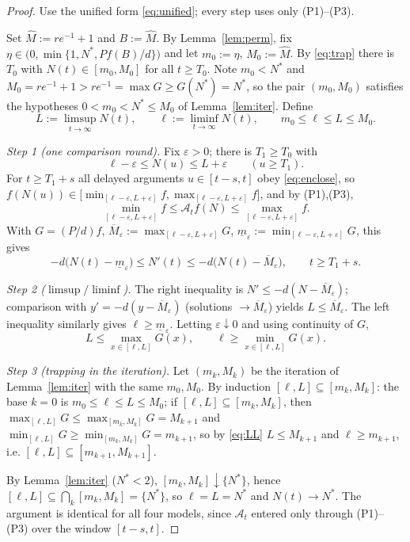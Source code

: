 \documentclass[12pt]{article}
\theoremstyle{definition}
\begin{document}
\begin{proof}
Use the unified form \eqref{eq:unified}; every step uses only (P1)--(P3).

Set $\widehat M:=re^{-1}+1$ and $B:=\widehat M$. By Lemma~\ref{lem:perm},
fix $\eta\in\bigl(0,\min\{1,N^*,Pf(B)/d\}\bigr)$ and let $m_0:=\eta$,
$M_0:=\widehat M$. By \eqref{eq:trap} there is $T_0$ with
$N(t)\in[m_0,M_0]$ for all $t\ge T_0$. Note $m_0<N^*$ and $M_0=re^{-1}+1>re^{-1}
=\max G\ge G(N^*)=N^*$, so the pair $(m_0,M_0)$ satisfies the hypotheses
$0<m_0<N^*\le M_0$ of Lemma~\ref{lem:iter}. Define
\[
  L:=\limsup_{t\to\infty}N(t),\qquad \ell:=\liminf_{t\to\infty}N(t),
  \qquad m_0\le\ell\le L\le M_0 .
\]

\emph{Step 1 (one comparison round).} Fix $\varepsilon>0$; there is $T_1\ge T_0$
with
\begin{equation}\label{eq:enclose}
  \ell-\varepsilon\le N(u)\le L+\varepsilon\qquad(u\ge T_1).
\end{equation}
For $t\ge T_1+s$ all delayed arguments $u\in[t-s,t]$ obey \eqref{eq:enclose}, so
$f(N(u))\in\bigl[\min_{[\ell-\varepsilon,L+\varepsilon]}f,
\max_{[\ell-\varepsilon,L+\varepsilon]}f\bigr]$, and by (P1),(P3),
\[
  \min_{[\ell-\varepsilon,L+\varepsilon]}f\le\mathcal A_tf(N)
  \le\max_{[\ell-\varepsilon,L+\varepsilon]}f .
\]
With $G=(P/d)f$, $\overline M_\varepsilon:=\max_{[\ell-\varepsilon,L+\varepsilon]}G$,
$\underline m_\varepsilon:=\min_{[\ell-\varepsilon,L+\varepsilon]}G$, this gives
\begin{equation}\label{eq:diffineq}
  -d\bigl(N(t)-\underline m_\varepsilon\bigr)\le N'(t)\le
  -d\bigl(N(t)-\overline M_\varepsilon\bigr),\qquad t\ge T_1+s .
\end{equation}

\emph{Step 2 ($\limsup/\liminf$).} The right inequality is
$N'\le -d(N-\overline M_\varepsilon)$; comparison with
$y'=-d(y-\overline M_\varepsilon)$ (solutions $\to\overline M_\varepsilon$)
yields $L\le\overline M_\varepsilon$. The left inequality similarly gives
$\ell\ge\underline m_\varepsilon$. Letting $\varepsilon\downarrow0$ and using
continuity of $G$,
\begin{equation}\label{eq:LL}
  L\le \max_{x\in[\ell,L]}G(x),\qquad \ell\ge\min_{x\in[\ell,L]}G(x).
\end{equation}

\emph{Step 3 (trapping in the iteration).} Let $(m_k,M_k)$ be the iteration of
Lemma~\ref{lem:iter} with the same $m_0,M_0$. By induction
$[\ell,L]\subseteq[m_k,M_k]$: the base $k=0$ is $m_0\le\ell\le L\le M_0$; if
$[\ell,L]\subseteq[m_k,M_k]$, then $\max_{[\ell,L]}G\le\max_{[m_k,M_k]}G=M_{k+1}$
and $\min_{[\ell,L]}G\ge\min_{[m_k,M_k]}G=m_{k+1}$, so by \eqref{eq:LL}
$L\le M_{k+1}$ and $\ell\ge m_{k+1}$, i.e.
$[\ell,L]\subseteq[m_{k+1},M_{k+1}]$.

By Lemma~\ref{lem:iter} ($N^*<2$), $[m_k,M_k]\downarrow\{N^*\}$, hence
$[\ell,L]\subseteq\bigcap_k[m_k,M_k]=\{N^*\}$, so $\ell=L=N^*$ and
$N(t)\to N^*$. The argument is identical for all four models, since
$\mathcal A_t$ entered only through (P1)--(P3) over the window $[t-s,t]$.
\end{proof}
\end{document}
